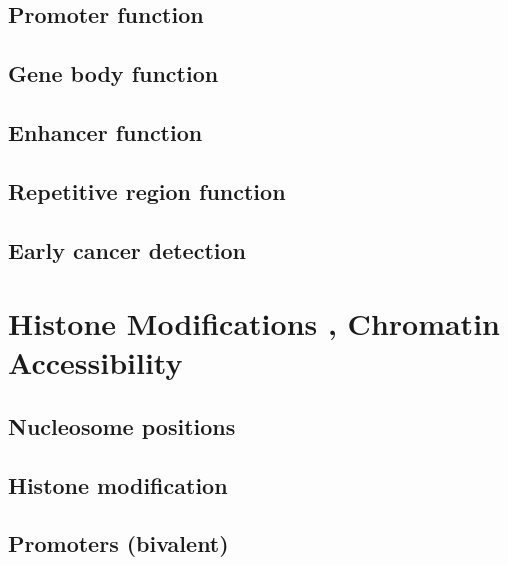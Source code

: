 \documentclass[]{book}
\begin{document}
\hypertarget{promoter-function}{%
\section{Promoter function}\label{promoter-function}}

\hypertarget{gene-body-function}{%
\section{Gene body function}\label{gene-body-function}}

\hypertarget{enhancer-function}{%
\section{Enhancer function}\label{enhancer-function}}

\hypertarget{repetitive-region-function}{%
\section{Repetitive region function}\label{repetitive-region-function}}

\hypertarget{early-cancer-detection}{%
\section{Early cancer detection}\label{early-cancer-detection}}

\hypertarget{hist}{%
\chapter{Histone Modifications , Chromatin Accessibility}\label{hist}}

\hypertarget{nucleosome-positions}{%
\section{Nucleosome positions}\label{nucleosome-positions}}

\hypertarget{histone-modification}{%
\section{Histone modification}\label{histone-modification}}

\hypertarget{promoters-bivalent}{%
\section{Promoters (bivalent)}\label{promoters-bivalent}}
\end{document}
